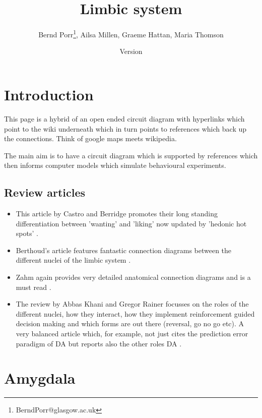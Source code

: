 \documentclass[12pt,a4paper]{article}
\title{Limbic system}
\author{Bernd Porr\footnote{BerndPorr@glasgow.ac.uk}, Ailsa Millen, Graeme Hattan, Maria Thomson}
\date{Version }
\let\oldsection\section
\renewcommand\section{\clearpage\oldsection}
\begin{document}
\maketitle

\ifx\HCode\undefined \else
{}
  \fi


\section{Introduction}
This page is a hybrid of an open ended circuit diagram with hyperlinks which point to the wiki underneath which in turn points to references which back up the connections. Think of google maps meets wikipedia.

The main aim is to have a circuit diagram which is supported by references which then informs computer models which simulate behavioural experiments.


\subsection{Review articles}
\begin{itemize}
\item This article by Castro and Berridge promotes their long standing differentiation between 'wanting' and 'liking' \citep{Berridge2009} now updated by 'hedonic hot spots' \citep{Castro2015}.
\item Berthoud's article features fantastic connection diagrams between the different nuclei of the limbic system \citep{Berthoud04}.
\item Zahm again provides very detailed anatomical connection diagrams and is a must read \citep{Zahm00}.
\item The review by  Abbas Khani and Gregor Rainer focusses on the roles of the different nuclei, how they interact, how they implement reinforcement guided decision making and which forms are out there (reversal, go no go etc). A very balanced article which, for example, not just cites the prediction error paradigm of DA but reports also the other roles DA \citep{Khani2016}.
\end{itemize}

\tableofcontents










\section{Amygdala}
\end{document}
